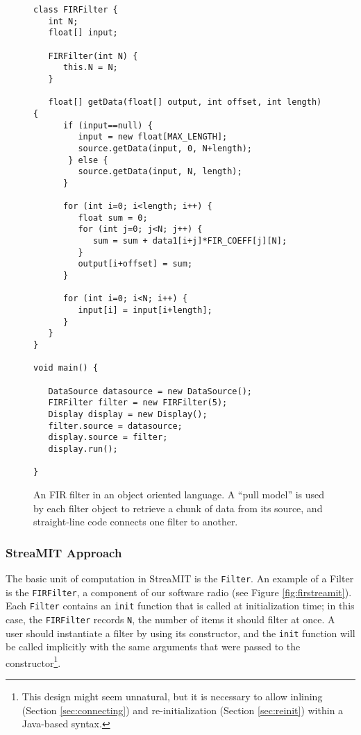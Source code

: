 \begin{figure}
\scriptsize
\begin{verbatim}
class FIRFilter {
   int N;
   float[] input;

   FIRFilter(int N) {
      this.N = N;
   }

   float[] getData(float[] output, int offset, int length) {
      if (input==null) {
         input = new float[MAX_LENGTH];
         source.getData(input, 0, N+length);
       } else {
         source.getData(input, N, length);
      }

      for (int i=0; i<length; i++) {
         float sum = 0;
         for (int j=0; j<N; j++) {
            sum = sum + data1[i+j]*FIR_COEFF[j][N];
         }
         output[i+offset] = sum;
      }

      for (int i=0; i<N; i++) {
         input[i] = input[i+length];
      }
   }
}

void main() {

   DataSource datasource = new DataSource();
   FIRFilter filter = new FIRFilter(5);
   Display display = new Display();
   filter.source = datasource;
   display.source = filter;
   display.run();

}
\end{verbatim}
\vspace{-12pt}
\caption{\protect\small An FIR filter in an object oriented language.
A ``pull model'' is used by each filter object to retrieve a chunk of
data from its source, and straight-line code connects one filter to
another.
\protect\label{fig:firobject}}
\vspace{-12pt}
\end{figure}

\subsubsection{StreaMIT Approach}

The basic unit of computation in StreaMIT is the {\tt Filter}.  An
example of a Filter is the {\tt FIRFilter}, a component of our
software radio (see Figure \ref{fig:firstreamit}).  Each {\tt Filter}
contains an {\tt init} function that is called at initialization time;
in this case, the {\tt FIRFilter} records {\tt N}, the number of items
it should filter at once.  A user should instantiate a filter by using
its constructor, and the {\tt init} function will be called implicitly
with the same arguments that were passed to the
constructor{\footnote{This design might seem unnatural, but it is
necessary to allow inlining (Section \ref{sec:connecting}) and
re-initialization (Section \ref{sec:reinit}) within a Java-based
syntax.}}.

